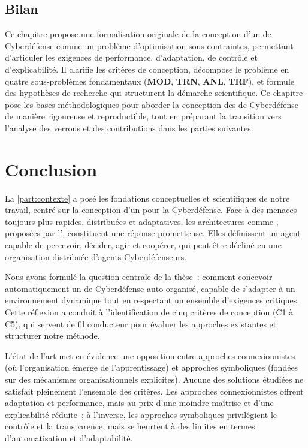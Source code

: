 \section{Bilan}
\noindent
Ce chapitre propose une formalisation originale de la conception d'un  de Cyberdéfense comme un problème d'optimisation sous contraintes, permettant d'articuler les exigences de performance, d'adaptation, de contrôle et d'explicabilité. Il clarifie les critères de conception, décompose le problème en quatre sous-problèmes fondamentaux (\textbf{MOD}, \textbf{TRN}, \textbf{ANL}, \textbf{TRF}), et formule des hypothèses de recherche qui structurent la démarche scientifique.
%
Ce chapitre pose les bases méthodologiques pour aborder la conception des  de Cyberdéfense de manière rigoureuse et reproductible, tout en préparant la transition vers l'analyse des verrous et des contributions dans les parties suivantes.

\clearpage
\thispagestyle{empty}
\null
\newpage

\chapter*{Conclusion}

La \autoref{part:contexte} a posé les fondations conceptuelles et scientifiques de notre travail, centré sur la conception d'un  pour la Cyberdéfense. Face à des menaces toujours plus rapides, distribuées et adaptatives, les architectures comme , proposées par l', constituent une réponse prometteuse. Elles définissent un agent capable de percevoir, décider, agir et coopérer, qui peut être décliné en une organisation distribuée d'agents Cyberdéfenseurs.

Nous avons formulé la question centrale de la thèse~: comment concevoir automatiquement un  de Cyberdéfense auto-organisé, capable de s'adapter à un environnement dynamique tout en respectant un ensemble d'exigences critiques. Cette réflexion a conduit à l'identification de cinq critères de conception (C1 à C5), qui servent de fil conducteur pour évaluer les approches existantes et structurer notre méthode.

L'état de l'art met en évidence une opposition entre approches connexionnistes (où l'organisation émerge de l'apprentissage) et approches symboliques (fondées sur des mécanismes organisationnels explicites). Aucune des solutions étudiées ne satisfait pleinement l'ensemble des critères. Les approches connexionnistes offrent adaptation et performance, mais au prix d'une moindre maîtrise et d'une explicabilité réduite~; à l'inverse, les approches symboliques privilégient le contrôle et la transparence, mais se heurtent à des limites en termes d'automatisation et d'adaptabilité.

